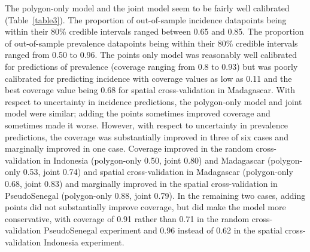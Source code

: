 \documentclass[10pt,letterpaper]{article}
\begin{document}
The polygon-only model and the joint model seem to be fairly well calibrated (Table~\ref{table3}).
The proportion of out-of-sample incidence datapoints being within their 80\% credible intervals ranged between 0.65 and 0.85.
The proportion of out-of-sample prevalence datapoints being within their 80\% credible intervals ranged from 0.50 to 0.96.
The points only model was reasonably well calibrated for predictions of prevalence (coverage ranging from 0.8 to 0.93) but was poorly calibrated for predicting incidence with coverage values as low as 0.11 and the best coverage value being 0.68 for spatial cross-validation in Madagascar.
With respect to uncertainty in incidence predictions, the polygon-only model and joint model were similar; adding the points sometimes improved coverage and sometimes made it worse.
However, with respect to uncertainty in prevalence predictions, the coverage was substantially improved in three of six cases and marginally improved in one case.
Coverage improved in the random cross-validation in Indonesia (polygon-only 0.50, joint 0.80) and Madagascar (polygon-only 0.53, joint 0.74) and spatial cross-validation in Madagascar (polygon-only 0.68, joint 0.83) and marginally improved in the spatial cross-validation in PseudoSenegal (polygon-only 0.88, joint 0.79).
In the remaining two cases, adding points did not substantially improve coverage, but did make the model more conservative, with coverage of 0.91 rather than 0.71 in the random cross-validation PseudoSenegal experiment and 0.96 instead of 0.62 in the spatial cross-validation Indonesia experiment.






\end{document}
